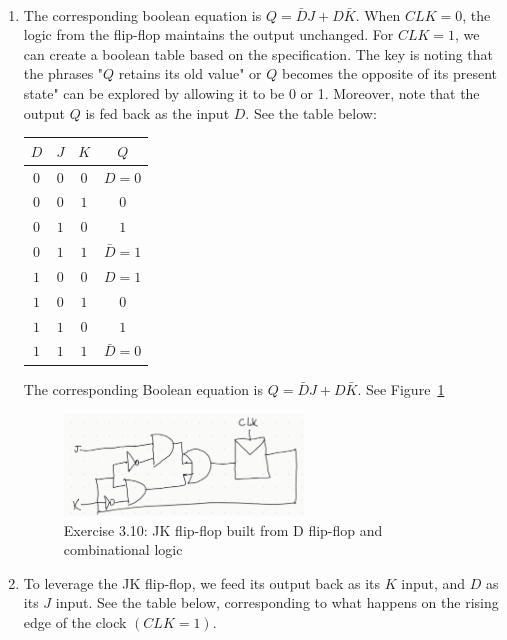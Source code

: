\documentclass[12pt]{article}
\newenvironment{sol}[1][Solution]{\begin{trivlist}
		\item[\hskip \labelsep {\bfseries #1:}]}{\end{trivlist}}
\begin{document}
\begin{sol}\
	
	\begin{enumerate}[label=(\alph*)]
		\item The corresponding boolean equation is $Q=\bar{D}J+D\bar{K}$. When $CLK=0$, the logic from the flip-flop maintains the output unchanged. For $CLK=1$, we can create a boolean table based on the specification. The
		key is noting that the phrases "$Q$ retains its old value" or $Q$ becomes the opposite of its present state" can be explored by allowing it to be 0 or 1. Moreover, note that the output $Q$ is fed back as the input $D$. See the table below:
		\begin{center}
			\begin{tabular}{ccc|c}
				$D$ & $J$ & $K$ & $Q$\\
				\hline
				$0$ & $0$ & $0$ & $D=0$\\
				$0$ & $0$ & $1$ & $0$ \\
				$0$ & $1$ & $0$ & $1$\\
				$0$ & $1$ & $1$ & $\bar{D}=1$\\
				$1$ & $0$ & $0$ & $D=1$\\
				$1$ & $0$ & $1$ & $0$ \\
				$1$ & $1$ & $0$ & $1$\\
				$1$ & $1$ & $1$ & $\bar{D}=0$\\
			\end{tabular}
		\end{center}
		The corresponding Boolean equation is $Q=\bar{D}J+D\bar{K}$. See Figure~\ref{03-10a-jk-flip-flop}
		\begin{figure}
			\centering
			\includegraphics[width=0.6\textwidth]{03-10a-JK-flip-flop}
			\caption{Exercise 3.10: JK flip-flop built from D flip-flop and combinational logic}
			\label{03-10a-jk-flip-flop}
		\end{figure}
		\item To leverage the JK flip-flop, we feed its output back as its $K$ input, and $D$ as its $J$ input. See the table below, corresponding to what happens on the rising edge of the clock $(CLK=1)$.
		\begin{center}

\end{center}
\end{enumerate}
\end{sol}
\end{document}
